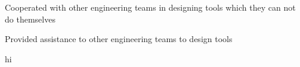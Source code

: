 \documentclass[]{deedy-resume-openfont}
\begin{document}
\begin{minipage}[t]{0.66\textwidth}
\begin{tightemize}
\item Cooperated with other engineering teams in designing tools which they can not do themselves
\item Provided assistance to other engineering teams to design tools
\end{tightemize}
\sectionsep

\begin{tightemize}
\item hi
\end{tightemize}
\sectionsep




\end{minipage} 
\end{document}
